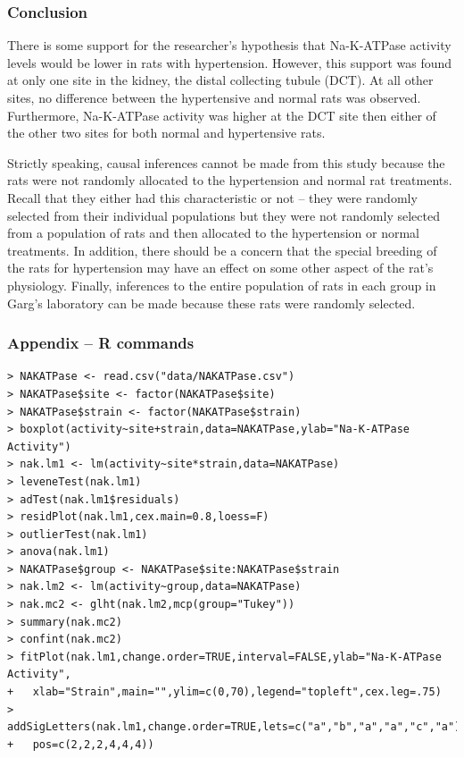 \documentclass[10pt,openany]{book}\usepackage[]{graphicx}\usepackage[]{color}
\begin{document}
\subsubsection*{Conclusion}
There is some support for the researcher's hypothesis that Na-K-ATPase activity levels would be lower in rats with hypertension.  However, this support was found at only one site in the kidney, the distal collecting tubule (DCT).  At all other sites, no difference between the hypertensive and normal rats was observed.  Furthermore, Na-K-ATPase activity was higher at the DCT site then either of the other two sites for both normal and hypertensive rats.

Strictly speaking, causal inferences cannot be made from this study because the rats were not randomly allocated to the hypertension and normal rat treatments.  Recall that they either had this characteristic or not -- they were randomly selected from their individual populations but they were not randomly selected from a population of rats and then allocated to the hypertension or normal treatments.  In addition, there should be a concern that the special breeding of the rats for hypertension may have an effect on some other aspect of the rat's physiology.  Finally, inferences to the entire population of rats in each group in Garg's laboratory can be made because these rats were randomly selected.

\newpage
\subsubsection*{Appendix -- R commands}
\begin{Verbatim}[formatcom=\color{red},xleftmargin=5mm,commandchars=\\\{\}]
> NAKATPase <- read.csv("data/NAKATPase.csv")
> NAKATPase$site <- factor(NAKATPase$site)
> NAKATPase$strain <- factor(NAKATPase$strain)
> boxplot(activity~site+strain,data=NAKATPase,ylab="Na-K-ATPase Activity")
> nak.lm1 <- lm(activity~site*strain,data=NAKATPase)
> leveneTest(nak.lm1)
> adTest(nak.lm1$residuals)
> residPlot(nak.lm1,cex.main=0.8,loess=F)
> outlierTest(nak.lm1)
> anova(nak.lm1)
> NAKATPase$group <- NAKATPase$site:NAKATPase$strain
> nak.lm2 <- lm(activity~group,data=NAKATPase)
> nak.mc2 <- glht(nak.lm2,mcp(group="Tukey"))
> summary(nak.mc2)
> confint(nak.mc2)
> fitPlot(nak.lm1,change.order=TRUE,interval=FALSE,ylab="Na-K-ATPase Activity",
+   xlab="Strain",main="",ylim=c(0,70),legend="topleft",cex.leg=.75)
> addSigLetters(nak.lm1,change.order=TRUE,lets=c("a","b","a","a","c","a"),
+   pos=c(2,2,2,4,4,4))
\end{Verbatim}
\end{document}
